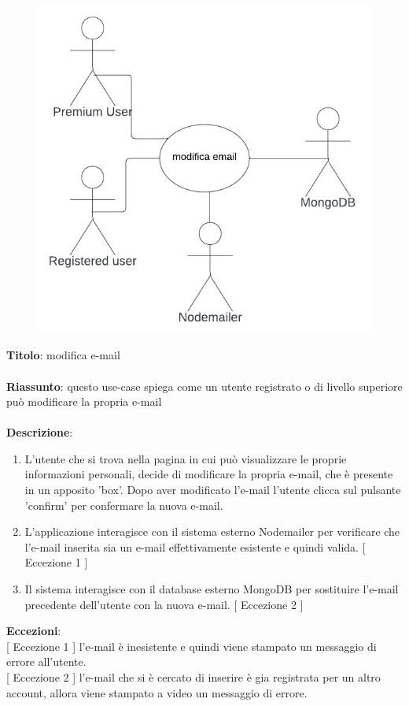 \begin{figure}[!h]
\centering
\includegraphics[scale=0.35]{images/use_case_modifica_email.png}
\end{figure}
\noindent
\textbf{Titolo}: modifica e-mail \\
\\
\textbf{Riassunto}: questo use-case spiega come un utente registrato o di livello superiore può modificare la propria e-mail \\
\\
\textbf{Descrizione}:
\begin{enumerate}
    \item L'utente che si trova nella pagina in cui può visualizzare le proprie informazioni personali, decide di modificare la propria e-mail, che è presente in un apposito 'box'. Dopo aver modificato l'e-mail l'utente clicca sul pulsante 'confirm' per confermare la nuova e-mail.
    \item L'applicazione interagisce con il sistema esterno Nodemailer per verificare che l'e-mail inserita sia un e-mail effettivamente esistente e quindi valida. {[ Eccezione 1 ]}
    \item Il sistema interagisce con il database esterno MongoDB per sostituire l'e-mail precedente dell'utente con la nuova e-mail. {[ Eccezione 2 ]}
\end{enumerate}
\textbf{Eccezioni}: \\
{[ Eccezione 1 ]} l'e-mail è inesistente e quindi viene stampato un messaggio di errore all'utente. \\
{[ Eccezione 2 ]} l'e-mail che si è cercato di inserire è gia registrata per un altro account, allora viene stampato a video un messaggio di errore.
\newpage

